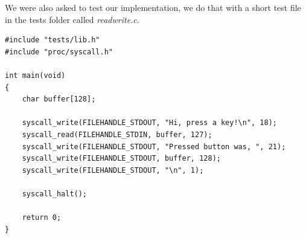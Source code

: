 \documentclass[11pt]{article}
\begin{document}
We were also asked to test our implementation, we do that with a short test file
in the tests folder called \textit{readwrite.c}.

\begin{lstlisting}[style=customc]
#include "tests/lib.h"
#include "proc/syscall.h"

int main(void)
{
    char buffer[128];

    syscall_write(FILEHANDLE_STDOUT, "Hi, press a key!\n", 18);
    syscall_read(FILEHANDLE_STDIN, buffer, 127);
    syscall_write(FILEHANDLE_STDOUT, "Pressed button was, ", 21);
    syscall_write(FILEHANDLE_STDOUT, buffer, 128);
    syscall_write(FILEHANDLE_STDOUT, "\n", 1);

    syscall_halt();

    return 0;
}
\end{lstlisting}
\end{document}

